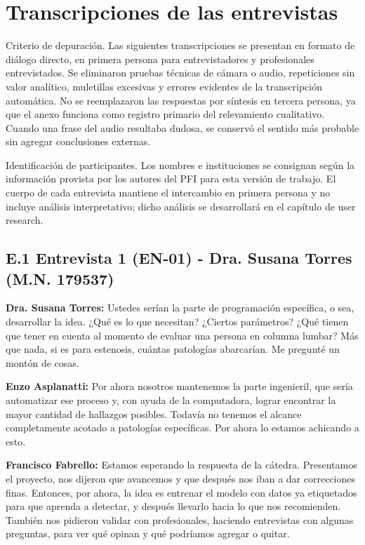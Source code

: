 \chapter{Transcripciones de las entrevistas}
\label{anexo:entrevistas}

Criterio de depuración. Las siguientes transcripciones se presentan en formato de diálogo directo, en primera persona para entrevistadores y profesionales entrevistados. Se eliminaron pruebas técnicas de cámara o audio, repeticiones sin valor analítico, muletillas excesivas y errores evidentes de la transcripción automática. No se reemplazaron las respuestas por síntesis en tercera persona, ya que el anexo funciona como registro primario del relevamiento cualitativo. Cuando una frase del audio resultaba dudosa, se conservó el sentido más probable sin agregar conclusiones externas.

Identificación de participantes. Los nombres e instituciones se consignan según la información provista por los autores del PFI para esta versión de trabajo. El cuerpo de cada entrevista mantiene el intercambio en primera persona y no incluye análisis interpretativo; dicho análisis se desarrollará en el capítulo de user research. %

\section*{E.1 Entrevista 1 (EN-01) - Dra. Susana Torres (M.N. 179537)}
\label{anexo:entrevista-en01}

\noindent\textbf{Dra. Susana Torres:} Ustedes serían la parte de programación específica, o sea, desarrollar la idea. ¿Qué es lo que necesitan? ¿Ciertos parámetros? ¿Qué tienen que tener en cuenta al momento de evaluar una persona en columna lumbar? Más que nada, si es para estenosis, cuántas patologías abarcarían. Me pregunté un montón de cosas.

\noindent\textbf{Enzo Asplanatti:} Por ahora nosotros mantenemos la parte ingenieril, que sería automatizar ese proceso y, con ayuda de la computadora, lograr encontrar la mayor cantidad de hallazgos posibles. Todavía no tenemos el alcance completamente acotado a patologías específicas. Por ahora lo estamos achicando a esto.

\noindent\textbf{Francisco Fabrello:} Estamos esperando la respuesta de la cátedra. Presentamos el proyecto, nos dijeron que avancemos y que después nos iban a dar correcciones finas. Entonces, por ahora, la idea es entrenar el modelo con datos ya etiquetados para que aprenda a detectar, y después llevarlo hacia lo que nos recomienden. También nos pidieron validar con profesionales, haciendo entrevistas con algunas preguntas, para ver qué opinan y qué podríamos agregar o quitar.

